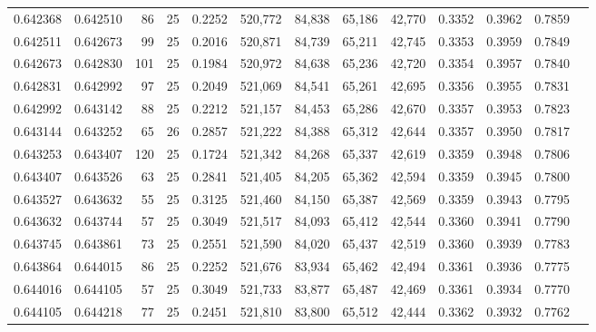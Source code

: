 \begin{tabular}{rrrrrrrrrrrrr}
0.642368 & 0.642510 &    86 &  25 &                                     0.2252 & 520,772 &  84,838 &  65,186 &  42,770 & 0.3352 & 0.3962 & 0.7859 \\
0.642511 & 0.642673 &    99 &  25 &                                     0.2016 & 520,871 &  84,739 &  65,211 &  42,745 & 0.3353 & 0.3959 & 0.7849 \\
0.642673 & 0.642830 &   101 &  25 &                                     0.1984 & 520,972 &  84,638 &  65,236 &  42,720 & 0.3354 & 0.3957 & 0.7840 \\
0.642831 & 0.642992 &    97 &  25 &                                     0.2049 & 521,069 &  84,541 &  65,261 &  42,695 & 0.3356 & 0.3955 & 0.7831 \\
0.642992 & 0.643142 &    88 &  25 &                                     0.2212 & 521,157 &  84,453 &  65,286 &  42,670 & 0.3357 & 0.3953 & 0.7823 \\
0.643144 & 0.643252 &    65 &  26 &                                     0.2857 & 521,222 &  84,388 &  65,312 &  42,644 & 0.3357 & 0.3950 & 0.7817 \\
0.643253 & 0.643407 &   120 &  25 &                                     0.1724 & 521,342 &  84,268 &  65,337 &  42,619 & 0.3359 & 0.3948 & 0.7806 \\
0.643407 & 0.643526 &    63 &  25 &                                     0.2841 & 521,405 &  84,205 &  65,362 &  42,594 & 0.3359 & 0.3945 & 0.7800 \\
0.643527 & 0.643632 &    55 &  25 &                                     0.3125 & 521,460 &  84,150 &  65,387 &  42,569 & 0.3359 & 0.3943 & 0.7795 \\
0.643632 & 0.643744 &    57 &  25 &                                     0.3049 & 521,517 &  84,093 &  65,412 &  42,544 & 0.3360 & 0.3941 & 0.7790 \\
0.643745 & 0.643861 &    73 &  25 &                                     0.2551 & 521,590 &  84,020 &  65,437 &  42,519 & 0.3360 & 0.3939 & 0.7783 \\
0.643864 & 0.644015 &    86 &  25 &                                     0.2252 & 521,676 &  83,934 &  65,462 &  42,494 & 0.3361 & 0.3936 & 0.7775 \\
0.644016 & 0.644105 &    57 &  25 &                                     0.3049 & 521,733 &  83,877 &  65,487 &  42,469 & 0.3361 & 0.3934 & 0.7770 \\
0.644105 & 0.644218 &    77 &  25 &                                     0.2451 & 521,810 &  83,800 &  65,512 &  42,444 & 0.3362 & 0.3932 & 0.7762 \\

\end{tabular}
